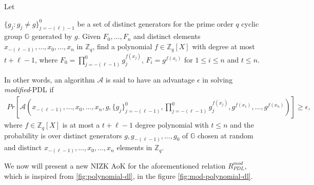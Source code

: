\begin{definition}
  Let\par 
  $\{g_j : g_j\neq g\}_{j=-(\ell)-1}^0$ be a set of distinct generators for the prime order $q$ cyclic 
  group $\mathbb{G}$ generated by $g$. Given $F_0,\dots,F_n$ and distinct elements $x_{-(\ell-1)},\dots,x_0,\dots,x_n$ in 
  $\mathbb{Z}_q$, find a polynomial $f\in\mathbb{Z}_q[X]$ with degree at most $t+\ell-1$, where $F_0=\prod_{j=-(\ell-1)}^{0}g_j^{f(x_j)}$, 
  $F_i=g^{f(x_i)}$ for $1\leq i\leq n$ and $t\leq n$.\par

  In other words, an algorithm $\mathcal{A}$ is said to have an advantage $\epsilon$ in solving \textit{modified}-PDL if 
  \begin{align*}
    Pr[\mathcal{A}(x_{-(\ell-1)},\dots,x_0,\dots,x_n,g,\{g_j\}_{j=-(\ell-1)}^0,\prod_{j=-(\ell-1)}^{0}g_j^{f(x_j)},g^{f(x_1)},\dots,g^{f(x_n)})]\geq\epsilon,
  \end{align*}
  where $f\in\mathbb{Z}_q[X]$ is at most a $t+\ell-1$ degree polynomial with $t\leq n$ and the probability is over 
  distinct generators $g,g_{-(\ell-1)},\dots,g_0$ of $\mathbb{G}$ chosen at random and distinct $x_{-(\ell-1)},\dots,x_0,\dots,x_n$ 
  elements in $\mathbb{Z}_q$.
\end{definition}

We now will present a new NIZK AoK for the aforementioned relation $R_{PDL}^{mod}$, which is inspired from \ref{fig:polynomial-dl}, 
in the figure \ref{fig:mod-polynomial-dl}.

